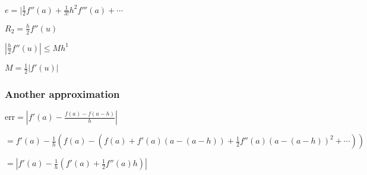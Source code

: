 \documentclass[11pt]{article}
\begin{document}
\(e = |\frac{1}{2} f''(a) + \frac{1}{3!}h^2 f'''(a) + \cdots\)

\(R_2 = \frac{h}{2} f''(u)\)

\(|\frac{h}{2} f''(u)| \leq M h^1\)

\(M = \frac{1}{2}|f'(u)|\)

\subsubsection{Another approximation}
\label{sec:org16193b9}

\(\text{err} = |f'(a) - \frac{f(a) - f(a - h)}{h}|\)

\(= f'(a) - \frac{1}{h}(f(a) - (f(a) + f'(a)(a - (a - h)) + \frac{1}{2}f''(a)(a-(a-h))^2 + \cdots))\)

\(= |f'(a) - \frac{1}{h}(f'(a) + \frac{1}{2}f''(a)h)|\)
\end{document}
